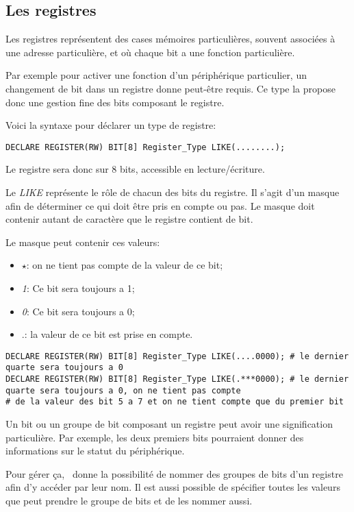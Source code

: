 \documentclass{rtxreport}
\begin{document}
\subsection{Les registres}
Les registres représentent des cases mémoires particulières, souvent associées
à une adresse particulière, et où chaque bit a une fonction particulière.

Par exemple pour activer une fonction d’un périphérique particulier, un
changement de bit dans un registre donne peut-être requis.
Ce type la propose donc une gestion fine des bits composant le registre.

Voici la syntaxe pour d\'eclarer un type de registre:
\begin{lstlisting}[caption=Declaration d'un type de registre sur un octet]
DECLARE REGISTER(RW) BIT[8] Register_Type LIKE(........);
\end{lstlisting}

Le registre sera donc sur 8 bits, accessible en lecture/écriture.

Le \emph{LIKE} représente le rôle de chacun des bits du registre. Il s'agit
d'un masque afin de déterminer ce qui doit être pris en compte ou pas.  Le
masque doit contenir autant de caractère que le registre contient de bit.

Le masque peut contenir ces valeurs:
\begin{itemize}
	\item $\star$: on ne tient pas compte de la valeur de ce bit;
	\item \emph{1}: Ce bit sera toujours a 1;
	\item \emph{0}: Ce bit sera toujours a 0;
	\item .: la valeur de ce bit est prise en compte.
\end{itemize}
\begin{lstlisting}[caption=Exemple de masque different]
DECLARE REGISTER(RW) BIT[8] Register_Type LIKE(....0000); # le dernier quarte sera toujours a 0
DECLARE REGISTER(RW) BIT[8] Register_Type LIKE(.***0000); # le dernier quarte sera toujours a 0, on ne tient pas compte
# de la valeur des bit 5 a 7 et on ne tient compte que du premier bit
\end{lstlisting}


Un bit ou un groupe de bit composant un registre peut avoir une signification particulière.
Par exemple, les deux premiers bits pourraient donner des informations sur le statut du
périphérique.

Pour gérer ça, \rtx\  donne la possibilité de nommer des groupes de bits d'un registre
afin d'y accéder par leur nom. Il est aussi possible de spécifier toutes les valeurs
que peut prendre le groupe de bits et de les nommer aussi.
\end{document}
